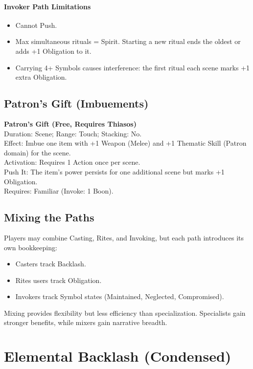 \paragraph{Invoker Path Limitations}
\begin{itemize}
  \item Cannot Push. 
  \item Max simultaneous rituals = Spirit. Starting a new ritual ends the oldest or adds +1 Obligation to it. 
  \item Carrying 4+ Symbols causes interference: the first ritual each scene marks +1 extra Obligation.
\end{itemize}

\subsection{Patron’s Gift (Imbuements)}
\textbf{Patron’s Gift (Free, Requires Thiasos)}\\
Duration: Scene; Range: Touch; Stacking: No.\\
Effect: Imbue one item with +1 Weapon (Melee) and +1 Thematic Skill (Patron domain) for the scene.\\
Activation: Requires 1 Action once per scene.\\
Push It: The item’s power persists for one additional scene but marks +1 Obligation.\\
Requires: Familiar (Invoke: 1 Boon).

\subsection{Mixing the Paths}
Players may combine Casting, Rites, and Invoking, but each path introduces its own bookkeeping:
\begin{itemize}
  \item Casters track Backlash. 
  \item Rites users track Obligation. 
  \item Invokers track Symbol states (Maintained, Neglected, Compromised). 
\end{itemize}
Mixing provides flexibility but less efficiency than specialization. Specialists gain stronger benefits, while mixers gain narrative breadth.


\section{Elemental Backlash (Condensed)}\label{sec:backlash-condensed}

